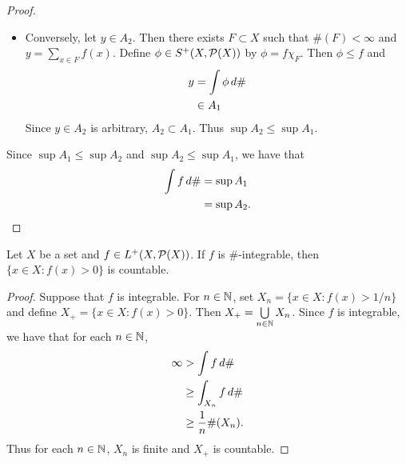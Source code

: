 \documentclass{book}
\begin{document}
\begin{proof}
\begin{itemize}
\begin{itemize}
				$$J = \{j \in \{1, \ldots, n\}: \#(E_j) < \infty \}, \quad F = \bigcup_{j \in J}E_j$$
				We note that since $J$ is finite, $\#(F) < \infty$ and for each $j \in J^c$, $a_j = 0$. Therefore
				\begin{align*}
					y
					& = \int \phi \dsh \\
					& = \sum\limits_{j =1}^n a_j \#(E_j) \\
					& = \sum\limits_{j \in J} a_j \#(E_j) \\
					& = \sum\limits_{j \in J} \sum\limits_{x \in E_j} \phi(x) \\
					& = \sum\limits_{x \in F} \phi(x) \\
					& \leq \sum\limits_{x \in F} f(x) \\
					& \leq \sup A_2 
				\end{align*}
			\end{itemize}
			Since $y \in A_1$ is arbitrary, we have that for each $y \in A_1$, $y \leq \sup A_2$. Hence $\sup A_1 \leq \sup A_2$. 
			\item Conversely, let $y \in A_2$. Then there exists $F \subset X$ such that $\#(F) < \infty$ and $y = \sum\limits_{x \in F} f(x)$.
			Define $\phi \in S^+(X, \mathcal{P}(X))$ by $\phi = f \chi_F$. Then $\phi \leq f$ and 
			\begin{align*}
				y 
				& = \int \phi \, d \# \\
				& \in A_1
			\end{align*}
			Since $y \in A_2$ is arbitrary, $A_2 \subset A_1$. Thus $\sup A_2 \leq \sup A_1$. 
		\end{itemize}
		Since $\sup A_1 \leq \sup A_2$ and $\sup A_2 \leq \sup A_1$, we have that
		\begin{align*}
			\int f \, d \# 
			& = \sup A_1 \\
			& = \sup A_2.
		\end{align*}
	\end{proof}

	\begin{ex} 
		 	Let $X$ be a set and $f \in L^+(X, \mathcal{P}(X))$. If $f$ is $\#$-integrable, then $\{x \in X: f(x) > 0\}$ is countable.
	\end{ex}

	\begin{proof} 
		Suppose that $f$ is integrable. For $n \in \mathbb{N}$, set $X_n = \{x \in X: f(x) > 1/n\}$ and define $X_+ = \{x \in X: f(x) > 0\}$. Then $X_+ = \bigcup\limits_{n \in \mathbb{N}}X_n$. Since $f$ is integrable, we have that for each $n \in \mathbb{N}$,
		\begin{align*}
			\infty 
			&> \int f \, d \#\\
			&\geq \int_{X_n} f \, d \# \\
			&\geq \frac{1}{n} \#(X_n).
		\end{align*}
		Thus for each $n \in \mathbb{N}$, $X_n$ is finite and $X_+$ is countable.
	\end{proof}
\end{document}
